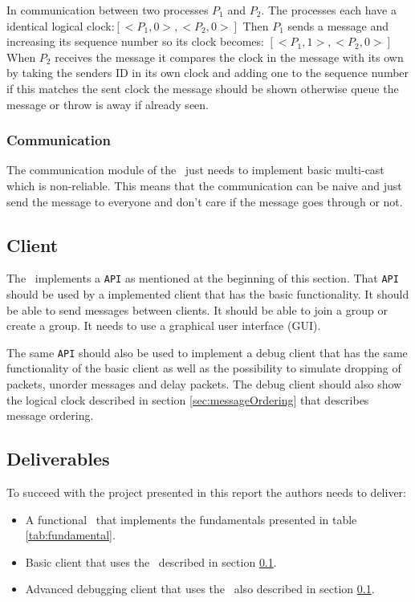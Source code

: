 \pagebreak

\begin{example}
In communication between two processes $P_1$ and $P_2$. The processes each have a identical logical clock:\newline $[<P_1, 0>, <P_2,0>]$\newline 
Then $P_1$ sends a message and increasing its sequence number so its clock becomes: \newline $[<P_1,1>,<P_2,0>]$\newline
When $P_2$ receives the message it compares the clock in the message with its own by taking the senders ID in its own clock and adding one to the sequence number if this matches the sent clock the message should be shown otherwise queue the message or throw is away if already seen.
\label{ex:1}
\end{example}

\subsubsection{Communication}
The communication module of the \mw\ just needs to implement basic multi-cast which is non-reliable. This means that the communication can be naive and just send the message to everyone and don't care if the message goes through or not.

\subsection{Client}\label{sec:client}
The \mw\ implements a \texttt{API} as mentioned at the beginning of this section. That \texttt{API} should be used by a implemented 
client that has the basic functionality. It should be able to send messages between clients. It should be able to join a group or create a group. It needs to use a graphical user interface (GUI).

The same \texttt{API} should also be used to implement a debug client that has the same functionality of the basic client as well as the possibility to simulate dropping of packets, unorder messages and delay packets. The debug client should also show the logical clock described in section \ref{sec:messageOrdering} that describes message ordering.



\subsection{Deliverables}
To succeed with the project presented in this report the authors needs to deliver:

\begin{itemize}
	\item A functional \mw\ that implements the fundamentals presented in table \ref{tab:fundamental}.
	\item Basic client that uses the \mw\ described in section \ref{sec:client}.
	\item Advanced debugging client that uses the \mw\ also described in section \ref{sec:client}.
\end{itemize}